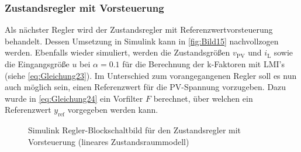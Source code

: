 \subsubsection{Zustandsregler mit Vorsteuerung} \label{sec:val_lin_vor}

Als nächster Regler wird der Zustandsregler mit Referenzwertvorsteuerung behandelt. Dessen Umsetzung in Simulink kann in \autoref{fig:Bild15} nachvollzogen werden. Ebenfalls wieder simuliert, werden die Zustandsgrößen $v_{\mathrm{PV}}$ und $i_{\mathrm{L}}$ sowie die Eingangsgröße $u$ bei $\alpha = 0.1$ für die Berechnung der k-Faktoren mit LMI's (siehe \autoref{eq:Gleichung23}). Im Unterschied zum vorangegangenen Regler soll es nun auch möglich sein, einen Referenzwert für die PV-Spannung vorzugeben. Dazu wurde in \autoref{eq:Gleichung24} ein Vorfilter $F$ berechnet, über welchen ein Referenzwert $y_{\mathrm{ref}}$ vorgegeben werden kann.

\begin{figure}[H]
    \centering
    \caption[Zustandsregler mit Vorsteuerung Simulink (linear)]{Simulink Regler-Blockschaltbild für den Zustandsregler mit Vorsteuerung (lineares Zustandsraummodell)}
    \label{fig:Bild15}
\end{figure}

